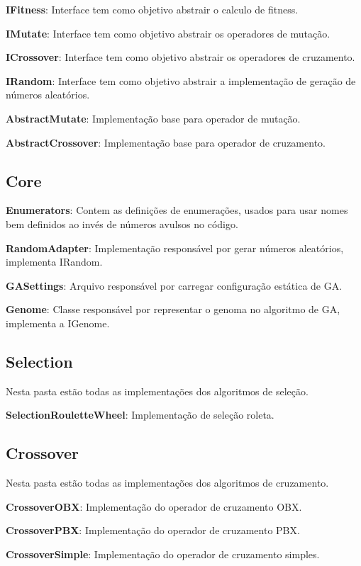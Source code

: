 \textbf{IFitness}: Interface tem como objetivo abstrair o calculo de fitness.

\textbf{IMutate}: Interface tem como objetivo abstrair os operadores de mutação.

\textbf{ICrossover}:  Interface tem como objetivo abstrair os operadores de cruzamento.

\textbf{IRandom}: Interface tem como objetivo abstrair a implementação de geração de números aleatórios.

\textbf{AbstractMutate}: Implementação base para operador de mutação.

\textbf{AbstractCrossover}: Implementação base para operador de cruzamento.

\subsection{Core}

\textbf{Enumerators}: Contem as definições de enumerações, usados para usar nomes bem definidos ao invés de números avulsos no código.

\textbf{RandomAdapter}: Implementação responsável por gerar números aleatórios, implementa IRandom.

\textbf{GASettings}: Arquivo responsável por carregar configuração estática de GA.

\textbf{Genome}: Classe responsável por representar o genoma no algoritmo de GA, implementa a IGenome.

\subsection{Selection}

Nesta pasta estão todas as implementações dos algoritmos de seleção.

\textbf{SelectionRouletteWheel}: Implementação de seleção roleta.

\subsection{Crossover}

Nesta pasta estão todas as implementações dos algoritmos de cruzamento.

\textbf{CrossoverOBX}: Implementação do operador de cruzamento OBX.

\textbf{CrossoverPBX}: Implementação do operador de cruzamento PBX.

\textbf{CrossoverSimple}:  Implementação do operador de cruzamento simples.

